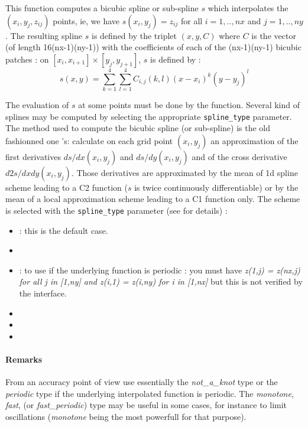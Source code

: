 \begin{mandescription}
    This function computes a bicubic spline or sub-spline $s$ which interpolates the 
    $(x_i,y_j,z_{ij})$ points, ie, we have $s(x_i,y_j)=z_{ij}$ for all  $i=1,..,nx$
    and $j=1,..,ny$. 
    The resulting spline $s$ is defined by the triplet $(x,y,C)$ where
    $C$ is the vector (of length 16(nx-1)(ny-1)) with the coefficients of each
    of the (nx-1)(ny-1) bicubic patches : on $[x_i, x_{i+1}] \times
    [y_j, y_{j+1}]$, $s$ is defined by :
    $$
       s(x,y) = \sum_{k=1}^4  \sum_{l=1}^4  C_{i,j}(k,l) (x - x_i)^k
       (y - y_j)^l
    $$

    The evaluation of  $s$ at some points must be done by the   
    function. Several kind of splines may be computed by selecting the appropriate 
    \verb!spline_type! parameter. The method used to compute the bicubic spline
    (or sub-spline) is the old fashionned one 's: calculate on each grid point
    $(x_i,y_j)$ an approximation of the first derivatives $ds/dx(x_i,y_j)$
    and $ds/dy(x_i,y_j)$ and of the cross derivative $d2s/dxdy(x_i,y_j)$.
    Those derivatives are approximated by the mean of 1d spline scheme leading to a C2
    function ($s$ is twice continuously differentiable) or by the mean of a
    local approximation scheme leading to a C1 function only. The scheme is selected
    with the \verb!spline_type! parameter (see   for details) :  
    
  \begin{itemize}

       \item {}: this is the default case.
       \item {} 
       \item {}: to use if the underlying function is periodic : you must have {\em z(1,j) = z(nx,j) for
              all j in [1,ny] and  z(i,1) = z(i,ny) for i in [1,nx]} but this is not verified
              by the interface.
       \item {} 
       \item {} 
       \item {}  
  \end{itemize}

  \end{mandescription}


  \paragraph{Remarks}
From an accuracy point of view use essentially the {\em not\_a\_knot} type or 
the {\em periodic} type if the underlying interpolated function is periodic.
The {\em monotone}, {\em fast},  (or {\em fast\_periodic}) type may
be useful in some cases, for instance to limit oscillations ({\em monotone} being the
most powerfull for that purpose).
    

